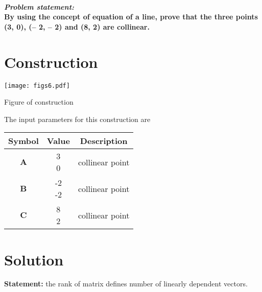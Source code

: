 \documentclass[10pt, a4paper]{article}
\title{\mytitle}
\author{\myauthor\hspace{1em}\\\contact\\FWC22076\hspace{6.5em}IITH\hspace{0.5em}\mymodule\hspace{6em}September}
\date{}
\newcommand{\myvec}[1]{\ensuremath{\begin{pmatrix}#1\end{pmatrix}}}
\let\vec\mathbf
\begin{document}
\maketitle
\paragraph{\textit{\large Problem statement: }\\
 By using the concept of equation of a line, prove that the three points (3, 0), (– 2, – 2) and (8, 2) are collinear. \\}
 \section*{Construction}
 	\begin{center}
\textsl{}  \texttt{[image: figs6.pdf]}
  
  Figure of construction
  	\end{center}
The input parameters for this construction are 
\begin{center}
\begin{tabular}{|c|c|c|}
	\hline
	\textbf{Symbol}&\textbf{Value}&\textbf{Description}\\
	\hline
	$\vec{A}$&\myvec{3\\0}&collinear point\\[8pt]
	\hline
		$\vec{B}$&\myvec{-2\\-2}&collinear point\\[8pt]
	\hline
		$\vec{C}$&\myvec{8\\2}&collinear point\\[8pt]
	\hline

\end{tabular}
\end{center}
\section*{Solution}
\textbf{Statement:}
the rank of matrix defines number of linearly dependent vectors.  
\\
\end{document}
